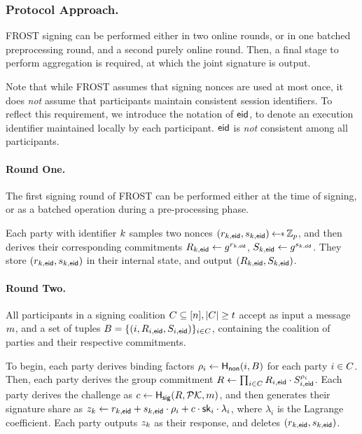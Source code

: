 \subsubsection{Protocol Approach.}

FROST signing can be performed either in two online rounds,
or in one batched preprocessing round,
and a second purely online round.
Then, a final stage to perform aggregation is required,
at which the joint signature is output.

Note that while FROST assumes that signing nonces are used at most once,
it does \emph{not} assume that participants maintain consistent session identifiers.
To reflect this requirement,
we introduce the notation of $\mathsf{eid}$, to denote an execution identifier maintained locally by each participant.
$\mathsf{eid}$ is \emph{not} consistent among all participants.

\paragraph{Round One.}
The first signing round of FROST can be performed either at the time of signing,
or as a batched operation during a pre-processing phase.

Each party with identifier $k$ samples two nonces $(r_{\partyid,\eid},  s_{\partyid, \eid}) \randpick \Zp$,
and then derives their corresponding commitments  $R_{k,\mathsf{eid}} \gets g^{r_{k, \mathsf{eid}}}$, $ S_{k,\mathsf{eid}} \gets  g^{s_{k,\mathsf{eid}}}$.
They store $(r_{k,\mathsf{eid}}, s_{k,\mathsf{eid}})$ in their internal state,
and output $(R_{k,\mathsf{eid}}, S_{k,\mathsf{eid}})$.

\paragraph{Round Two.}
All participants in a signing coalition $C \subseteq [n], \lvert C \rvert \geq t$ accept as input a message $m$,
and a set of tuples $B = \{ (i, R_{i,\mathsf{eid}}, S_{i,\mathsf{eid}})\}_{i \in C}$,
containing the coalition of parties and their respective commitments.

To begin,
each party derives binding factors $\rho_i \gets \mathsf{H_{non}}(i, B)$ for each party $i \in C$.
Then, each party derives the group commitment $R \gets \prod_{i \in C} R_{i,\mathsf{eid}} \cdot  S_{i,\mathsf{eid}}^{\rho_i}$.
Each party derives the challenge as $c \gets \mathsf{H_{sig}}(R, \mathcal{PK}, m)$,
and then generates their signature share as
$z_k \gets r_{k,\mathsf{eid}} + s_{k,\mathsf{eid}} \cdot \rho_i + c \cdot \mathsf{sk}_i \cdot \lambda_i$,
where $\lambda_i$ is the Lagrange coefficient.
Each party outputs $z_k$ as their response,
and deletes $(r_{k,\mathsf{eid}}, s_{k,\mathsf{eid}})$.


